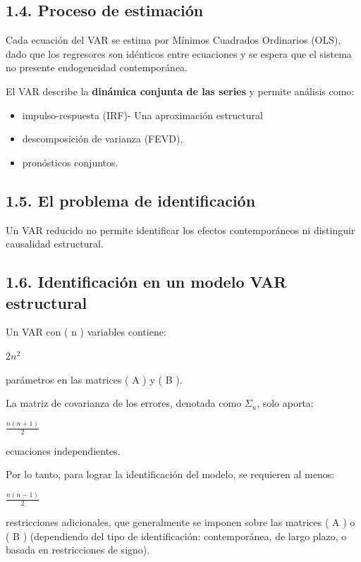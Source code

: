 \documentclass[
  spanish,
  letterpaper,
  DIV=11,
  numbers=noendperiod]{scrartcl}
\begin{document}
\subsection{1.4. Proceso de estimación}\label{proceso-de-estimaciuxf3n}

Cada ecuación del VAR se estima por Mínimos Cuadrados Ordinarios (OLS),
dado que los regresores son idénticos entre ecuaciones y se espera que
el sistema no presente endogeneidad contemporánea.

El VAR describe la \textbf{dinámica conjunta de las series} y permite
análisis como:

\begin{itemize}
\item
  impulso-respuesta (IRF)- Una aproximación estructural
\item
  descomposición de varianza (FEVD),
\item
  pronósticos conjuntos.
\end{itemize}

\subsection{1.5. El problema de
identificación}\label{el-problema-de-identificaciuxf3n}

Un VAR reducido no permite identificar los efectos contemporáneos ni
distinguir causalidad estructural.

\subsection{1.6. Identificación en un modelo VAR
estructural}\label{identificaciuxf3n-en-un-modelo-var-estructural}

Un VAR con ( n ) variables contiene:

\(2n^2\)

parámetros en las matrices ( A ) y ( B ).

La matriz de covarianza de los errores, denotada como \(\Sigma_u\), solo
aporta:

\(\frac{n(n + 1)}{2}\)

ecuaciones independientes.

Por lo tanto, para lograr la identificación del modelo, se requieren al
menos:

\(\frac{n(n - 1)}{2}\)

restricciones adicionales, que generalmente se imponen sobre las
matrices ( A ) o ( B ) (dependiendo del tipo de identificación:
contemporánea, de largo plazo, o basada en restricciones de signo).
\end{document}
